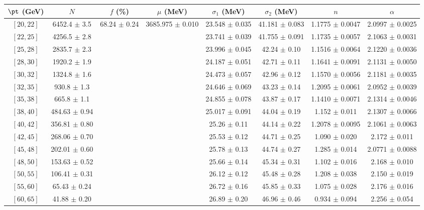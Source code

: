 \begin{tabular}{c||c|c|c|c|c|c|c}
$\pt$ (GeV) & $N$ & $f$ (\%) & $\mu$ (MeV) & $\sigma_1$ (MeV) & $\sigma_2$ (MeV) & $n$ & $\alpha$ \\
\hline
$[20, 22]$ & 6452.4 $\pm$ 3.5 & \multirow{20}{*}{68.24 $\pm$ 0.24} & \multirow{20}{*}{3685.975 $\pm$ 0.010} & 23.548 $\pm$ 0.035 & 41.181 $\pm$ 0.083 & 1.1775 $\pm$ 0.0047 & 2.0997 $\pm$ 0.0025\\
$[22, 25]$ & 4256.5 $\pm$ 2.8 &  &  & 23.741 $\pm$ 0.039 & 41.755 $\pm$ 0.091 & 1.1735 $\pm$ 0.0057 & 2.1063 $\pm$ 0.0031\\
$[25, 28]$ & 2835.7 $\pm$ 2.3 &  &  & 23.996 $\pm$ 0.045 & 42.24 $\pm$ 0.10 & 1.1516 $\pm$ 0.0064 & 2.1220 $\pm$ 0.0036\\
$[28, 30]$ & 1920.2 $\pm$ 1.9 &  &  & 24.187 $\pm$ 0.051 & 42.71 $\pm$ 0.11 & 1.1641 $\pm$ 0.0091 & 2.1131 $\pm$ 0.0050\\
$[30, 32]$ & 1324.8 $\pm$ 1.6 &  &  & 24.473 $\pm$ 0.057 & 42.96 $\pm$ 0.12 & 1.1570 $\pm$ 0.0056 & 2.1181 $\pm$ 0.0035\\
$[32, 35]$ & 930.8 $\pm$ 1.3 &  &  & 24.646 $\pm$ 0.069 & 43.23 $\pm$ 0.14 & 1.2095 $\pm$ 0.0061 & 2.0952 $\pm$ 0.0039\\
$[35, 38]$ & 665.8 $\pm$ 1.1 &  &  & 24.855 $\pm$ 0.078 & 43.87 $\pm$ 0.17 & 1.1410 $\pm$ 0.0071 & 2.1314 $\pm$ 0.0046\\
$[38, 40]$ & 484.63 $\pm$ 0.94 &  &  & 25.017 $\pm$ 0.091 & 44.04 $\pm$ 0.19 & 1.152 $\pm$ 0.011 & 2.1307 $\pm$ 0.0066\\
$[40, 42]$ & 356.81 $\pm$ 0.80 &  &  & 25.26 $\pm$ 0.11 & 44.14 $\pm$ 0.22 & 1.2078 $\pm$ 0.0095 & 2.1061 $\pm$ 0.0063\\
$[42, 45]$ & 268.06 $\pm$ 0.70 &  &  & 25.53 $\pm$ 0.12 & 44.71 $\pm$ 0.25 & 1.090 $\pm$ 0.020 & 2.172 $\pm$ 0.011\\
$[45, 48]$ & 202.01 $\pm$ 0.60 &  &  & 25.78 $\pm$ 0.13 & 44.74 $\pm$ 0.27 & 1.285 $\pm$ 0.014 & 2.0771 $\pm$ 0.0088\\
$[48, 50]$ & 153.63 $\pm$ 0.52 &  &  & 25.66 $\pm$ 0.14 & 45.34 $\pm$ 0.31 & 1.102 $\pm$ 0.016 & 2.168 $\pm$ 0.010\\
$[50, 55]$ & 106.41 $\pm$ 0.31 &  &  & 26.12 $\pm$ 0.12 & 45.48 $\pm$ 0.28 & 1.208 $\pm$ 0.038 & 2.150 $\pm$ 0.019\\
$[55, 60]$ & 65.43 $\pm$ 0.24 &  &  & 26.72 $\pm$ 0.16 & 45.85 $\pm$ 0.33 & 1.075 $\pm$ 0.028 & 2.176 $\pm$ 0.016\\
$[60, 65]$ & 41.88 $\pm$ 0.20 &  &  & 26.89 $\pm$ 0.20 & 46.96 $\pm$ 0.46 & 0.934 $\pm$ 0.094 & 2.256 $\pm$ 0.054\\

\end{tabular}
